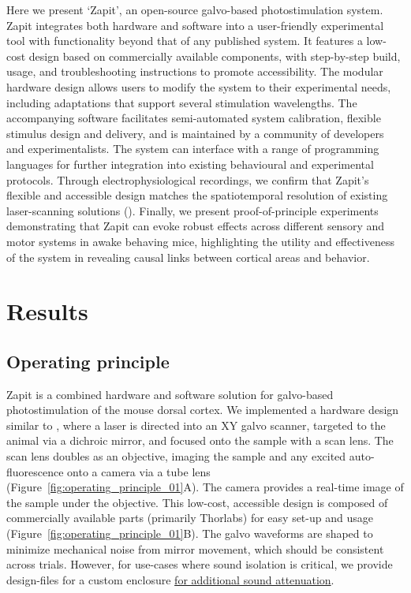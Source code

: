 \documentclass[9pt,lineno]{elife}
\begin{document}
Here we present `Zapit', an open-source galvo-based photostimulation system.
Zapit integrates both hardware and software into a user-friendly experimental tool with functionality beyond that of any published system.
It features a low-cost design based on commercially available components, with step-by-step build, usage, and troubleshooting instructions to promote accessibility.
The modular hardware design allows users to modify the system to their experimental needs, including adaptations that support several stimulation wavelengths.
The accompanying software facilitates semi-automated system calibration, flexible stimulus design and delivery,  and is maintained by a community of developers and experimentalists.
The system can interface with a range of programming languages for further integration into existing behavioural and experimental protocols.
Through electrophysiological recordings, we confirm that Zapit's flexible and accessible design matches the spatiotemporal resolution of existing laser-scanning solutions (\citealp{Pinto2022MultipleCortex,Guo2014FlowMice,Li2019SpatiotemporalCircuits}).
Finally, we present proof-of-principle experiments demonstrating that Zapit can evoke robust effects across different sensory and motor systems in awake behaving mice, highlighting the utility and effectiveness of the system in revealing causal links between cortical areas and behavior.
\section{Results}

\subsection{Operating principle}
Zapit is a combined hardware and software solution for galvo-based photostimulation of the mouse dorsal cortex.
We implemented a hardware design similar to \citet{Pinto2019Task-DependentRegions,Pinto2022MultipleCortex}, where a laser is directed into an XY galvo scanner, targeted to the animal via a dichroic mirror, and focused onto the sample with a scan lens.
The scan lens doubles as an objective, imaging the sample and any excited auto-fluorescence onto a camera via a tube lens (Figure~\ref{fig:operating_principle_01}A).
The camera provides a real-time image of the sample under the objective.
This low-cost, accessible design is composed of commercially available parts (primarily Thorlabs) for easy set-up and usage (Figure~\ref{fig:operating_principle_01}B).
The galvo waveforms are shaped to minimize mechanical noise from mirror movement, which should be consistent across trials.
However, for use-cases where sound isolation is critical, we provide design-files for a custom enclosure \href{https://github.com/Zapit-Optostim/zapit_CAD/tree/main}{for additional sound attenuation}.
\end{document}
